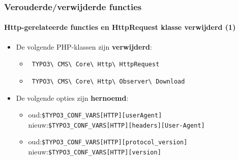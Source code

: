 \begin{frame}[fragile]
	\frametitle{Verouderde/verwijderde functies}
	\framesubtitle{Http-gerelateerde functies en HttpRequest klasse verwijderd (1)}

	\begin{itemize}

		\item De volgende PHP-klassen zijn \textbf{verwijderd}:

			\begin{itemize}
				\item \small\texttt{
					TYPO3\textbackslash
					CMS\textbackslash
					Core\textbackslash
					Http\textbackslash
					HttpRequest}\normalsize
				\item \small\texttt{
					TYPO3\textbackslash
					CMS\textbackslash
					Core\textbackslash
					Http\textbackslash
					Observer\textbackslash
					Download}\normalsize
			\end{itemize}

		\item De volgende opties zijn \textbf{hernoemd}:

			\begin{itemize}

				\item
					\small
						oud:\tabto{1cm}\texttt{\$TYPO3\_CONF\_VARS[HTTP][userAgent]}\newline
						nieuw:\tabto{1cm}\texttt{\$TYPO3\_CONF\_VARS[HTTP][headers][User-Agent]}

				\item
					\small
						oud:\tabto{1cm}\texttt{\$TYPO3\_CONF\_VARS[HTTP][protocol\_version]}\newline
						nieuw:\tabto{1cm}\texttt{\$TYPO3\_CONF\_VARS[HTTP][version]}

			\end{itemize}

	\end{itemize}

\end{frame}


